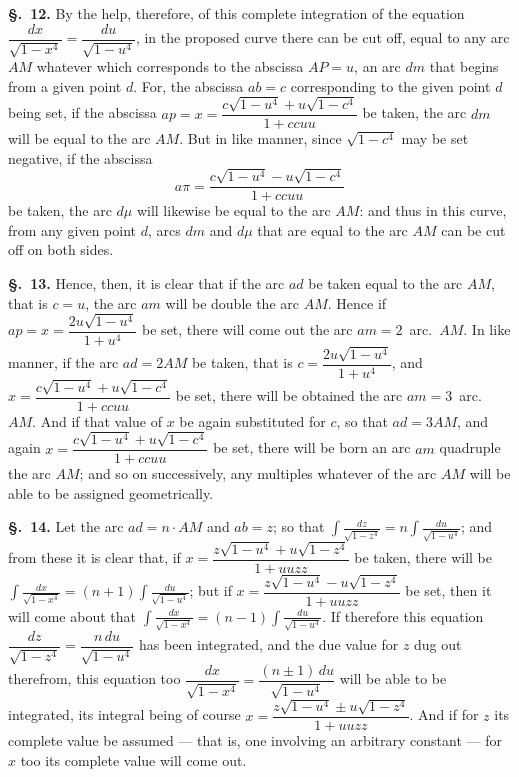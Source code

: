 \documentclass{article}
\begin{document}
\textbf{§.~12.} By the help, therefore, of this complete integration of the equation
$\dfrac{dx}{\sqrt{1-x^{4}}} = \dfrac{du}{\sqrt{1-u^{4}}}$, in the proposed curve there can be cut off,
equal to any arc $AM$ whatever which corresponds to the abscissa $AP = u$, an arc $dm$ that begins
from a given point $d$. For, the abscissa $ab = c$ corresponding to the given point $d$ being set, if
the abscissa $ap = x = \dfrac{c\sqrt{1-u^{4}} + u\sqrt{1-c^{4}}}{1+ccuu}$ be taken, the arc $dm$ will
be equal to the arc $AM$.
But in like manner, since $\sqrt{1-c^{4}}$ may be set negative, if the abscissa
\[ a\pi = \frac{c\sqrt{1-u^{4}} - u\sqrt{1-c^{4}}}{1+ccuu} \]
be taken, the arc $d\mu$ will likewise be equal to the arc $AM$: and thus in this curve, from any
given point $d$, arcs $dm$ and $d\mu$ that are equal to the arc $AM$ can be cut off on both sides.

\textbf{§.~13.} Hence, then, it is clear that if the arc $ad$ be taken equal to the arc $AM$, that is
$c = u$, the arc $am$ will be double the arc $AM$. Hence if $ap = x = \dfrac{2u\sqrt{1-u^{4}}}{1+u^{4}}$
be set, there will come out the arc $am = 2$~arc.~$AM$. In like manner, if the arc $ad = 2AM$ be
taken, that is $c = \dfrac{2u\sqrt{1-u^{4}}}{1+u^{4}}$, and
$x = \dfrac{c\sqrt{1-u^{4}} + u\sqrt{1-c^{4}}}{1+ccuu}$ be set, there will be obtained the arc
$am = 3$~arc.~$AM$. And if that value of $x$ be again substituted for $c$, so that $ad = 3AM$, and
again $x = \dfrac{c\sqrt{1-u^{4}} + u\sqrt{1-c^{4}}}{1+ccuu}$ be set, there will be born an arc $am$
quadruple the arc $AM$; and so on successively, any multiples whatever of the arc $AM$ will be able
to be assigned geometrically.

\textbf{§.~14.} Let the arc $ad = n \cdot AM$ and $ab = z$; so that
$\displaystyle\int \frac{dz}{\sqrt{1-z^{4}}} = n\int \frac{du}{\sqrt{1-u^{4}}}$; and from these it is clear that,
if $x = \dfrac{z\sqrt{1-u^{4}} + u\sqrt{1-z^{4}}}{1+uuzz}$ be taken, there will be
$\displaystyle\int \frac{dx}{\sqrt{1-x^{4}}} = (n+1)\int \frac{du}{\sqrt{1-u^{4}}}$; but if
$x = \dfrac{z\sqrt{1-u^{4}} - u\sqrt{1-z^{4}}}{1+uuzz}$ be set, then it will come about that
$\displaystyle\int \frac{dx}{\sqrt{1-x^{4}}} = (n-1)\int \frac{du}{\sqrt{1-u^{4}}}$. If therefore this equation
$\dfrac{dz}{\sqrt{1-z^{4}}} = \dfrac{n\,du}{\sqrt{1-u^{4}}}$ has been integrated, and the due value for
$z$ dug out therefrom, this equation too
$\dfrac{dx}{\sqrt{1-x^{4}}} = \dfrac{(n\pm1)\,du}{\sqrt{1-u^{4}}}$ will be able to be integrated, its
integral being of course
$x = \dfrac{z\sqrt{1-u^{4}} \pm u\sqrt{1-z^{4}}}{1+uuzz}$. And if for $z$ its complete value be
assumed — that is, one involving an arbitrary constant — for $x$ too its complete value will come
out.
\end{document}
